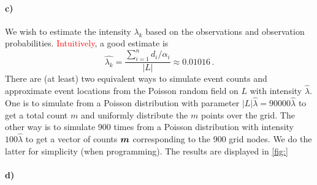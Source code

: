 \paragraph{c)}
We wish to estimate the intensity $\lambda_k$ based on the observations and observation probabilities. \textcolor{red}{Intuitively}, a good estimate is
%
\begin{equation*}
    \hat{\lambda_k} = \frac{\sum_{i=1}^n d_i / \alpha_i}{|L|} \approx 0.01016 \, .
\end{equation*}
%
There are (at least) two equivalent ways to simulate event counts and approximate event locations from the Poisson random field on $L$ with intensity $\hat{\lambda}$. One is to simulate from a Poisson distribution with parameter $|L|\hat{\lambda} = 90000\hat{\lambda}$ to get a total count $m$ and uniformly distribute the $m$ points over the grid. The other way is to simulate 900 times from a Poisson distribution with intensity $100\hat{\lambda}$ to get a vector of counts $\bm{m}$ corresponding to the 900 grid nodes. We do the latter for simplicity (when programming). The results are displayed in \ref{fig:}

\paragraph{d)}